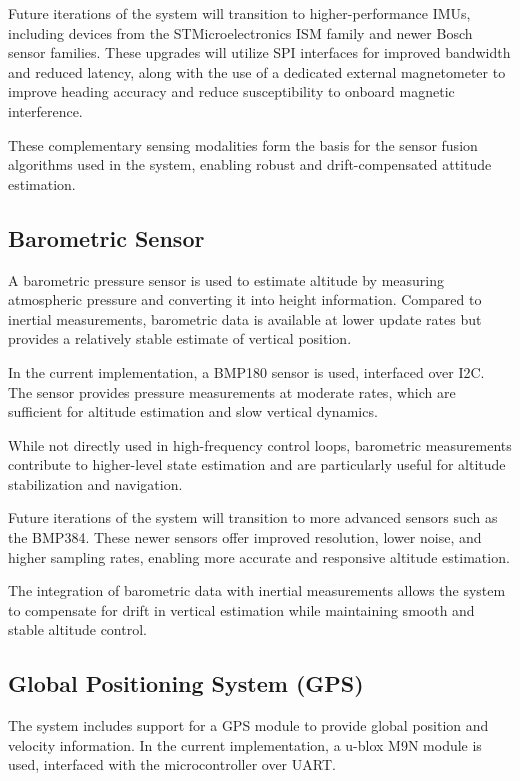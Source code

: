 Future iterations of the system will transition to higher-performance IMUs, including devices from the STMicroelectronics ISM family and newer Bosch sensor families. These upgrades will utilize SPI interfaces for improved bandwidth and reduced latency, along with the use of a dedicated external magnetometer to improve heading accuracy and reduce susceptibility to onboard magnetic interference.

These complementary sensing modalities form the basis for the sensor fusion algorithms used in the system, enabling robust and drift-compensated attitude estimation.

\subsection{Barometric Sensor}

A barometric pressure sensor is used to estimate altitude by measuring atmospheric pressure and converting it into height information. Compared to inertial measurements, barometric data is available at lower update rates but provides a relatively stable estimate of vertical position.

In the current implementation, a BMP180 sensor is used, interfaced over I2C. The sensor provides pressure measurements at moderate rates, which are sufficient for altitude estimation and slow vertical dynamics.

While not directly used in high-frequency control loops, barometric measurements contribute to higher-level state estimation and are particularly useful for altitude stabilization and navigation.

Future iterations of the system will transition to more advanced sensors such as the BMP384. These newer sensors offer improved resolution, lower noise, and higher sampling rates, enabling more accurate and responsive altitude estimation.

The integration of barometric data with inertial measurements allows the system to compensate for drift in vertical estimation while maintaining smooth and stable altitude control.

\subsection{Global Positioning System (GPS)}

The system includes support for a GPS module to provide global position and velocity information. In the current implementation, a u-blox M9N module is used, interfaced with the microcontroller over UART.


